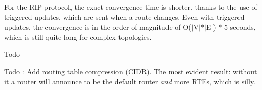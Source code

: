 For the R\+IP protocol, the exact convergence time is shorter, thanks to the use of triggered updates, which are sent when a route changes. Even with triggered updates, the convergence is in the order of magnitude of O($\vert$\+V$\vert$$\ast$$\vert$\+E$\vert$) $\ast$ 5 seconds, which is still quite long for complex topologies.

\begin{DoxyRefDesc}{Todo}
\item[\hyperlink{todo__todo000061}{Todo}]\+: Add routing table compression (C\+I\+DR). The most evident result\+: without it a router will announce to be the default router {\itshape and} more R\+T\+Es, which is silly. \end{DoxyRefDesc}
